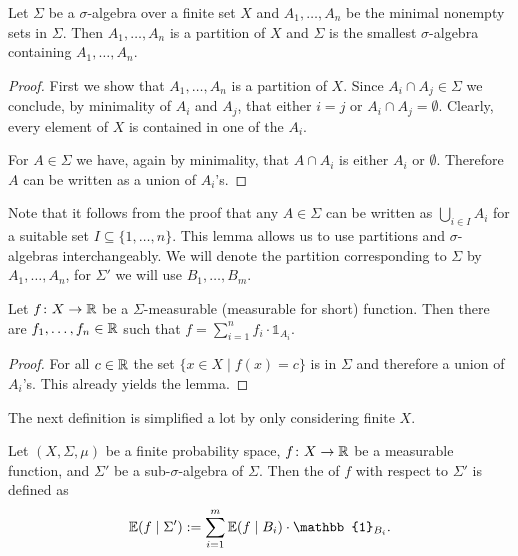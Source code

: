 \begin{lemma}
	Let $\Sigma$ be a $\sigma$-algebra over a finite set $X$ and $A_1,\dots,A_n$ be the minimal nonempty sets in $\Sigma$. Then $A_1,\dots,A_n$ is a partition of $X$ and $\Sigma$ is the smallest $\sigma$-algebra containing $A_1,\dots,A_n$.
\end{lemma}
\begin{proof}
	First we show that $A_1,\dots,A_n$ is a  partition of $X$. Since $A_i\cap A_j\in\Sigma$ we conclude, by minimality of $A_i$ and $A_j$, that either $i=j$ or $A_i\cap A_j=\emptyset$. Clearly, every element of $X$ is contained in one of the $A_i$. 
				
	For $A\in\Sigma$ we have, again by minimality, that $A\cap A_i$ is either $A_i$ or $\emptyset$. Therefore $A$ can be written as a union of $A_i$'s.
\end{proof}
Note that it follows from the proof that any $A\in\Sigma$ can be written as $\bigcup_{i\in I}A_i$ for a suitable set $I\subseteq\{1,\dots,n\}$. This lemma allows us to use partitions and $\sigma$-algebras interchangeably. We will denote the partition corresponding to $\Sigma$ by $A_1,\dots,A_n$, for $\Sigma'$ we will use $B_1,\dots,B_{m}$.
\begin{lemma}\label{lem:measurabilityForm}
	Let $f\colon X\to\mathbb{R}$ be a $\Sigma$-measurable (measurable for short) function. Then there are $f_1,\dots,f_n\in\mathbb{R}$ such that $f=\sum_{i=1}^{n}f_i\cdot\mathbb{1}_{A_i}$.
\end{lemma}
\begin{proof}
	For all $c\in\mathbb{R}$ the set $\{x\in X\mid f(x)=c\}$ is in $\Sigma$ and therefore a union of $A_i$'s. This already yields the lemma.
\end{proof}
		
The next definition is simplified a lot by only considering finite $X$.
		
\begin{definition}
	Let $(X,\Sigma,\mu)$ be a finite probability space, $f\colon X\to \mathbb{R}$ be a measurable function, and $\Sigma'$ be a sub-$\sigma$-algebra of $\Sigma$. Then the  of $f$ with respect to $\Sigma'$ is defined as
	\[\E(f\mid \Sigma'):=\sum_{i=1}^{m}\E(f\mid B_i)\cdot \mathbb{1}_{B_i}.\]
\end{definition}
		
